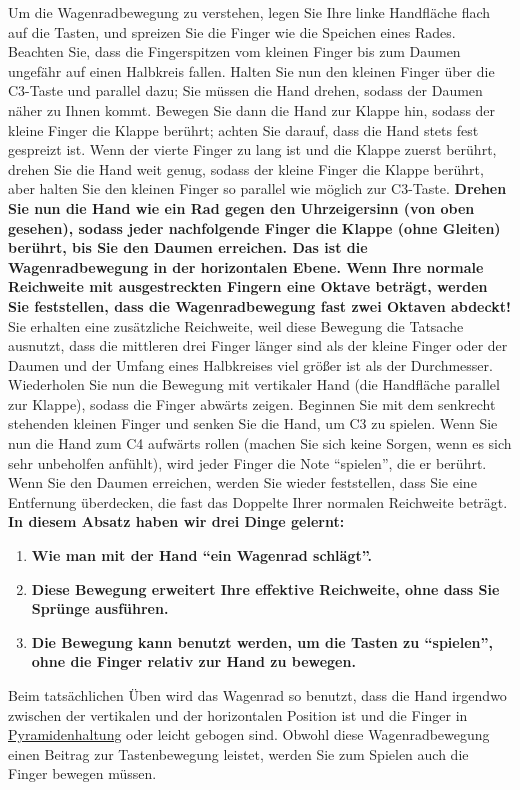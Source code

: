Um die Wagenradbewegung zu verstehen, legen Sie Ihre linke Handfläche flach auf die Tasten, und spreizen Sie die Finger wie die Speichen eines Rades.
Beachten Sie, dass die Fingerspitzen vom kleinen Finger bis zum Daumen ungefähr auf einen Halbkreis fallen.
Halten Sie nun den kleinen Finger über die C3-Taste und parallel dazu; Sie müssen die Hand drehen, sodass der Daumen näher zu Ihnen kommt.
Bewegen Sie dann die Hand zur Klappe hin, sodass der kleine Finger die Klappe berührt; achten Sie darauf, dass die Hand stets fest gespreizt ist.
Wenn der vierte Finger zu lang ist und die Klappe zuerst berührt, drehen Sie die Hand weit genug, sodass der kleine Finger die Klappe berührt, aber halten Sie den kleinen Finger so parallel wie möglich zur C3-Taste.
\textbf{Drehen Sie nun die Hand wie ein Rad gegen den Uhrzeigersinn (von oben gesehen), sodass jeder nachfolgende Finger die Klappe (ohne Gleiten) berührt, bis Sie den Daumen erreichen.
Das ist die Wagenradbewegung in der horizontalen Ebene.
Wenn Ihre normale Reichweite mit ausgestreckten Fingern eine Oktave beträgt, werden Sie feststellen, dass die Wagenradbewegung fast zwei Oktaven abdeckt!}
Sie erhalten eine zusätzliche Reichweite, weil diese Bewegung die Tatsache ausnutzt, dass die mittleren drei Finger länger sind als der kleine Finger oder der Daumen und der Umfang eines Halbkreises viel größer ist als der Durchmesser.
Wiederholen Sie nun die Bewegung mit vertikaler Hand (die Handfläche parallel zur Klappe), sodass die Finger abwärts zeigen.
Beginnen Sie mit dem senkrecht stehenden kleinen Finger und senken Sie die Hand, um C3 zu spielen.
Wenn Sie nun die Hand zum C4 aufwärts rollen (machen Sie sich keine Sorgen, wenn es sich sehr unbeholfen anfühlt), wird jeder Finger die Note \enquote{spielen}, die er berührt.
Wenn Sie den Daumen erreichen, werden Sie wieder feststellen, dass Sie eine Entfernung überdecken, die fast das Doppelte Ihrer normalen Reichweite beträgt.
\textbf{In diesem Absatz haben wir drei Dinge gelernt:}

\begin{enumerate} 
 \item \textbf{Wie man mit der Hand \enquote{ein Wagenrad schlägt}.}
 \item \textbf{Diese Bewegung erweitert Ihre effektive Reichweite, ohne dass Sie Sprünge ausführen.}
 \item \textbf{Die Bewegung kann benutzt werden, um die Tasten zu \enquote{spielen}, ohne die Finger relativ zur Hand zu bewegen.}
 \end{enumerate}
Beim tatsächlichen Üben wird das Wagenrad so benutzt, dass die Hand irgendwo zwischen der vertikalen und der horizontalen Position ist und die Finger in \hyperlink{c1iii4b}{Pyramidenhaltung} oder leicht gebogen sind.
Obwohl diese Wagenradbewegung einen Beitrag zur Tastenbewegung leistet, werden Sie zum Spielen auch die Finger bewegen müssen.

